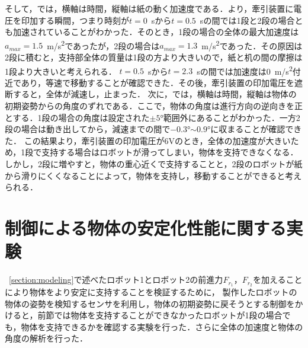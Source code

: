 そして，では，横軸は時間，縦軸は紙の動く加速度である．より，牽引装置に電圧を印加する瞬間，つまり時刻が$t=0$~sから$t=0.5$~sの間では1段と2段の場合とも加速されていることがわかった．そのとき，1段の場合の全体の最大加速度は$a_{max}=1.5$~\si{m/s^2}であったが，2段の場合は$a_{max}=1.3$~\si{m/s^2}であった．その原因は2段に積むと，支持部全体の質量は1段の方より大きいので，紙と机の間の摩擦は1段より大きいと考えられる．
$t=0.5$~sから$t=2.3$~sの間では加速度は0~\si{m/s^2}付近であり，等速で移動することが確認できた．その後，牽引装置の印加電圧を遮断すると，全体が減速し，止まった．
次に，では，横軸は時間，縦軸は物体の初期姿勢からの角度のずれである．ここで，物体の角度は進行方向の逆向きを正とする．1段の場合の角度は設定された$\pm5$\si{\degree}範囲外にあることがわかった．一方2段の場合は動き出してから，減速までの間で$-0.3$\si{\degree}$\sim0.9$\si{\degree}に収まることが確認できた．
この結果より，牽引装置の印加電圧が6Vのとき，全体の加速度が大きいため，1段で支持する場合はロボットが滑ってしまい，物体を支持できなくなる．しかし，2段に増やすと，物体の重心近くで支持することと，2段のロボットが紙から滑りにくくなることによって，物体を支持し，移動することができると考えられる．

\section{制御による物体の安定化性能に関する実験}
\label{section:exp3}
~\ref{section:modeling}で述べたロボット1とロボット2の前進力$F_{r_{1}}$，$F_{r_{2}}$を加えることにより物体をより安定に支持することを検証するために，
製作したロボットの物体の姿勢を検知するセンサを利用し，物体の初期姿勢に戻そうとする制御をかけると，前節では物体を支持することができなかったロボットが1段の場合でも，物体を支持できるかを確認する実験を行った．さらに全体の加速度と物体の角度の解析を行った．

